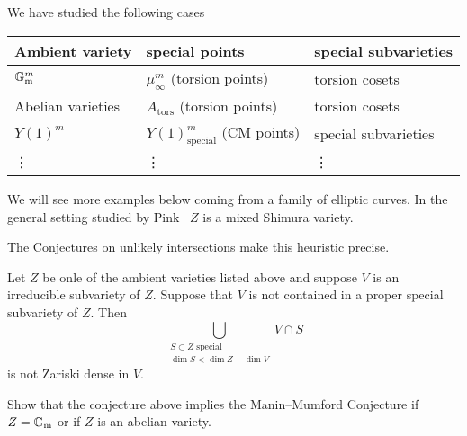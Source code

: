 We have studied the following cases
\begin{center}
  \begin{tabular}{l|l|l}
    Ambient variety & special points & special subvarieties \\
    \hline
    ${\mathbb{G}}_{\mathrm{m}}^m$ & $\mu_\infty^m$ (torsion points) & torsion cosets \\
    Abelian varieties & $A_{\mathrm{tors}}$ (torsion points) & torsion cosets \\
    $Y(1)^m$ & $Y(1)^m_{\mathrm{special}}$ (CM points) & special
                                                         subvarieties
    \\
    \vdots & \vdots & \vdots
  \end{tabular}
\end{center}

We will see more examples below coming from a family of elliptic
curves. In the  general setting studied by Pink~\cite{Pink}
$Z$ is a mixed Shimura variety.

The Conjectures on unlikely intersections make this heuristic precise.

\begin{conjecture}
  \label{conj:ZP}
  Let $Z$ be onle of the ambient varieties listed above and suppose
  $V$ is an irreducible subvariety of $Z$. Suppose that $V$ is not
  contained in a proper special subvariety of $Z$.
  Then
  \begin{equation*}
    \bigcup_{\substack{S\subset Z \text{ special} \\ \dim S < \dim
        Z-\dim V}} V\cap S
  \end{equation*}
  is not Zariski dense in $V$. 
\end{conjecture}

\begin{exercise}
  Show that the conjecture above implies the Manin--Mumford Conjecture
  if $Z = {\mathbb{G}}_{\mathrm{m}}$ or if $Z$ is an abelian variety. 
\end{exercise}

